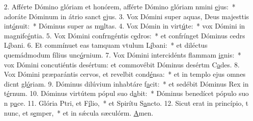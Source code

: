 2. Afférte Dómino glóriam et honórem, afférte Dómino glóriam nmini \uline{e}jus:~* adoráte Dóminum in átrio sanct \uline{e}jus.
3. Vox Dómini super aquas, Deus majesttis int\uline{ó}nuit:~* Dóminus super as m\uline{u}ltas.
4. Vox Dómin in virt\uline{ú}te:~* vox Dómini in magnifc\uline{é}ntia.
5. Vox Dómini confrngéntis c\uline{e}dros:~* et confrínget Dóminus cedrs L\uline{í}bani.
6. Et commínuet eas tamquam vtulum L\uline{í}bani:~* et diléctus quemádmodum fílius unc\uline{ó}rnium.
7. Vox Dómini intercidénts flammam \uline{i}gnis:~* vox Dómini concutiéntis desértum: et commovébit Dóminus desértm C\uline{a}des.
8. Vox Dómini præparántis cervos, et revelbit cond\uline{é}nsa:~* et in templo ejus omnes dicnt gl\uline{ó}riam.
9. Dóminus dilúvium inhabtáre f\uline{a}cit:~* et sedébit Dóminus Rex in t\uline{é}rnum.
10. Dóminus virtútem pópul suo d\uline{a}bit:~* Dóminus benedícet pópulo suo n p\uline{a}ce.
11. Glória Ptri, et F\uline{í}lio,~* et Spirítu S\uline{a}ncto.
12. Sicut erat in princípio, t nunc, et s\uline{e}mper,~* et in sǽcula sæculórm. \uline{A}men.
